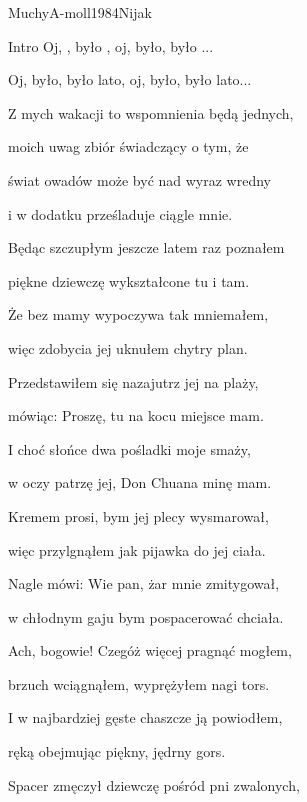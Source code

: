 \begin{song}{Muchy}{A-moll}{1984}{Nijak}{}{}

	\begin{SBBracket}{Intro}
	Oj, , było , oj, było, było ...

	Oj, było, było lato, oj, było, było lato...
	\end{SBBracket}

	\begin{SBVerse}
	Z mych wakacji to wspomnienia będą jednych,

	moich uwag zbiór świadczący o tym, że

	świat owadów może być nad wyraz wredny

	i w dodatku prześladuje ciągle mnie.
	\end{SBVerse}
	\begin{SBVerse}
	Będąc szczupłym jeszcze latem raz poznałem

	piękne dziewczę wykształcone tu i tam.

	Że bez mamy wypoczywa tak mniemałem,

	więc zdobycia jej uknułem chytry plan.
	\end{SBVerse}
	\begin{SBVerse}
	Przedstawiłem się nazajutrz jej na plaży,

	mówiąc: Proszę, tu na kocu miejsce mam.

	I choć słońce dwa pośladki moje smaży,

	w oczy patrzę jej, Don Chuana minę mam.
	\end{SBVerse}
	\begin{SBVerse}
	Kremem prosi, bym jej plecy wysmarował,

	więc przylgnąłem jak pijawka do jej ciała.

	Nagle mówi: Wie pan, żar mnie zmitygował,

	w chłodnym gaju bym pospacerować chciała.
	\end{SBVerse}
	\begin{SBVerse}
	Ach, bogowie! Czegóż więcej pragnąć mogłem,

	brzuch wciągnąłem, wyprężyłem nagi tors.

	I w najbardziej gęste chaszcze ją powiodłem,

	ręką obejmując piękny, jędrny gors.
	\end{SBVerse}
	\begin{SBVerse}
	Spacer zmęczył dziewczę pośród pni zwalonych,


\end{SBVerse}
\end{song}
